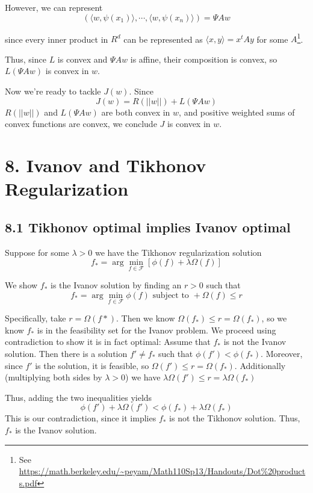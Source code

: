 \documentclass[paper=a4, fontsize=11pt]{scrartcl} %
\numberwithin{equation}{section} %
\numberwithin{figure}{section} %
\numberwithin{table}{section} %
\begin{document}
However, we can represent
\[(\langle w , \psi(x_1)\rangle, \cdots, \langle  w , \psi(x_n)\rangle) = \Psi A w\]

since every inner product in $R^d$ can be represented as $\langle x, y \rangle = x^t A y$ for some $A$\footnote{See \url{https://math.berkeley.edu/~peyam/Math110Sp13/Handouts/Dot\%20products.pdf}}. 

Thus, since $L$ is convex and $\Psi A w$ is affine, their composition is convex, so $L(\Psi A w)$ is convex in $w$.

Now we're ready to tackle $J(w)$. Since
\[J(w) = R(||w||) + L( \Psi A w)\]
$R(||w||)$ and $L(\Psi A w)$ are both convex in $w$, and positive weighted sums of convex functions are convex, we conclude $J$ is convex in $w$.


\section*{8. Ivanov and Tikhonov Regularization}
\subsection*{8.1 Tikhonov optimal implies Ivanov optimal}

Suppose for some $\lambda > 0$ we have the Tikhonov regularization solution
\[f_* = \arg \min_{f \in \mathcal{F}} [\phi(f) + \lambda \Omega(f)]\]

We show $f_*$ is the Ivanov solution by finding an $r > 0$ such that
\[f_* = \arg \min_{f \in \mathcal{F}} \phi(f) \textrm{ subject to } + \Omega(f) \leq r\]

Specifically, take $r = \Omega(f*)$. Then we know $\Omega(f_*) \leq r = \Omega(f_*)$, so we know $f_*$ is in the feasibility set for the Ivanov problem. We proceed using contradiction to show it is in fact optimal:
Assume that $f_*$ is not the Ivanov solution. Then there is a solution $f' \neq f_*$ such that $\phi(f') < \phi(f_*)$. Moreover, since $f'$ is the solution, it is feasible, so $\Omega(f') \leq r = \Omega(f_*)$. Additionally (multiplying both sides by $\lambda > 0$) we have $\lambda \Omega(f') \leq r = \lambda \Omega(f_*)$

Thus, adding the two inequalities yields
\[\phi(f') + \lambda \Omega(f') < \phi(f_*) + \lambda \Omega(f_*)\]
This is our contradiction, since it implies $f_*$ is not the Tikhonov solution. Thus, $f_*$ is the Ivanov solution.
\end{document}
